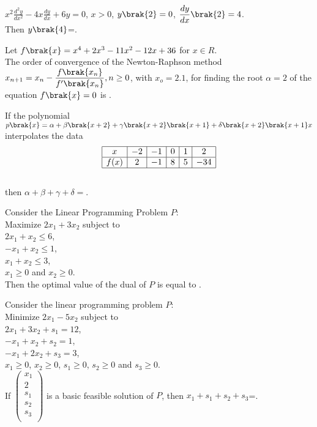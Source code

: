    $\displaystyle x^2\frac{d^2y}{dx^2}-4x\frac{dy}{dx}+6y=0$, $x>0$, $y\brak{2}=0$, $\displaystyle \frac{dy}{dx}\brak{2}=4$.\\
    Then $y\brak{4}$=\underline{\hspace{1.5cm}}.
    \item Let $f\brak{x}=x^4+2x^3-11x^2-12x+36$ for $x\in R$.\\The order of convergence of the Newton-Raphson method \\ $\displaystyle x_{n+1}=x_n-\frac{f\brak{x_n}}{f'\brak{x_n}}, n\geq0$, with $x_o=2.1$, for finding the root $\alpha=2$ of the equation $f\brak{x}=0$ is \underline{\hspace{1.5cm}}.
    \item If the polynomial\\
    $\displaystyle p\brak{x}=\alpha+\beta\brak{x+2}+\gamma\brak{x+2}\brak{x+1}+\delta\brak{x+2}\brak{x+1}x$ interpolates the data\\
\[
\centering
\begin{array}{|c|c|c|c|c|c|}
\hline
x & -2 & -1 & 0 & 1 & 2 \\
\hline
f(x) & 2 & -1 & 8 & 5 & -34 \\
\hline
\end{array}
\]\\then $\alpha+\beta+\gamma+\delta=$\underline{\hspace{1.5cm}}.
    \item Consider the Linear Programming Problem $P$:\\
    Maximize $2x_1+3x_2$ subject to\\$2x_1+x_2\leq6$,\\$-x_1+x_2\leq1$,\\$x_1+x_2\leq3$,\\$x_1\geq0$ and $x_2\geq0$.\\Then the optimal value of the dual of $P$ is equal to \underline{\hspace{1.5cm}}.
    \item Consider the linear programming problem $P$:\\ Minimize $2x_1-5x_2$ subject to\\
    $2x_1+3x_2+s_1=12$,\\$-x_1+x_2+s_2=1$,\\$-x_1+2x_2+s_3=3$,\\$x_1\geq0$, $x_2\geq0$, $s_1\geq0$, $s_2\geq0$ and $s_3\geq0$.\\If $\begin{pmatrix}
x_1\\
2\\
s_1\\
s_2\\
s_3\\
\end{pmatrix}$ is a basic feasible solution of $P$, then $x_1+s_1+s_2+s_3$=\underline{\hspace{1.5cm}}.
